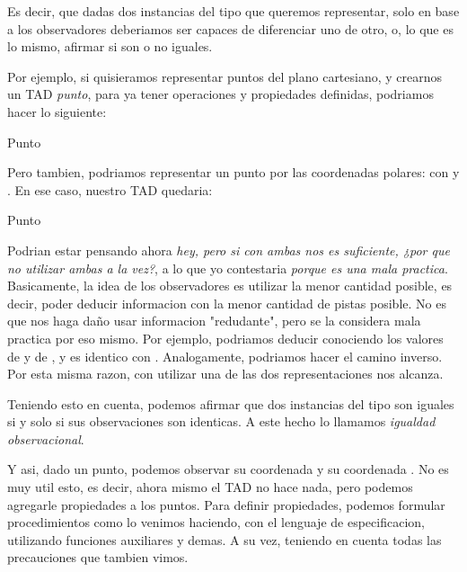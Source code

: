 \documentclass{article}
\begin{document}
Es decir, que dadas dos instancias del tipo que queremos representar, solo en base a los observadores deberiamos ser capaces de diferenciar uno de otro, o, lo que es lo mismo, afirmar si son o no iguales.

Por ejemplo, si quisieramos representar puntos del plano cartesiano, y crearnos un TAD \textit{punto}, para ya tener operaciones y propiedades definidas, podriamos hacer lo siguiente:

\begin{tad}{Punto}
	 \\
\end{tad}

Pero tambien, podriamos representar un punto por las coordenadas polares: con \formula{\rho} y \formula{\theta}. En ese caso, nuestro TAD quedaria:

\begin{tad}{Punto}
	\obs{\formula{\rho}}{\float} \\
	\obs{\formula{\theta}}{\float}
\end{tad}

Podrian estar pensando ahora \textit{hey, pero si con ambas nos es suficiente, ¿por que no utilizar ambas a la vez?}, a lo que yo contestaria \textit{porque es una mala practica}. Basicamente, la idea de los observadores es utilizar la menor cantidad posible, es decir, poder deducir informacion con la menor cantidad de pistas posible. No es que nos haga daño usar informacion "redudante", pero se la considera mala practica por eso mismo. Por ejemplo, podriamos deducir \formula{\rho} conociendo los valores de  y de , y es identico con \formula{\theta}. Analogamente, podriamos hacer el camino inverso. Por esta misma razon, con utilizar una de las dos representaciones nos alcanza.

Teniendo esto en cuenta, podemos afirmar que dos instancias del tipo  son iguales si y solo si sus observaciones son identicas. A este hecho lo llamamos \textit{igualdad observacional}.

Y asi, dado un punto, podemos observar su coordenada  y su coordenada . No es muy util esto, es decir, ahora mismo el TAD no hace nada, pero podemos agregarle propiedades a los puntos. Para definir propiedades, podemos formular procedimientos como lo venimos haciendo, con el lenguaje de especificacion, utilizando funciones auxiliares y demas. A su vez, teniendo en cuenta todas las precauciones que tambien vimos. 
\end{document}
